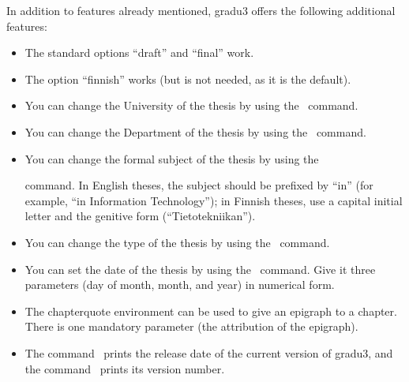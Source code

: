 \documentclass[utf8,english]{gradu3}
\begin{document}
In addition to features already mentioned, gradu3 offers the following
additional features:
\begin{itemize}
\item The standard options ``draft'' and ``final''  work.
\item The option ``finnish'' works (but is not needed, as it is the default).
\item You can change the University of the thesis by using the
  \string\university\ command.
\item You can change the Department of the thesis by using the
  \string\department\ command.
\item You can change the formal subject of the thesis by using the
  \string\subject\ command.  In English theses, the subject should be
  prefixed by ``in'' (for example, ``in Information Technology''); in
  Finnish theses, use a capital initial letter and the genitive form
  (``Tietotekniikan'').
\item You can change the type of the thesis by using the \string\type\
  command.
\item You can set the date of the thesis by using the \string\setdate\
  command.  Give it three parameters (day of month, month, and year)
  in numerical form.
\item The chapterquote environment can be used to give an epigraph to
  a chapter.  There is one mandatory parameter (the attribution of the
  epigraph).
\item The command \string\graduclsdate\ prints the release date of the
  current version of gradu3, and the command \string\graduclsversion\
  prints its version number.
\end{itemize}
\end{document}
